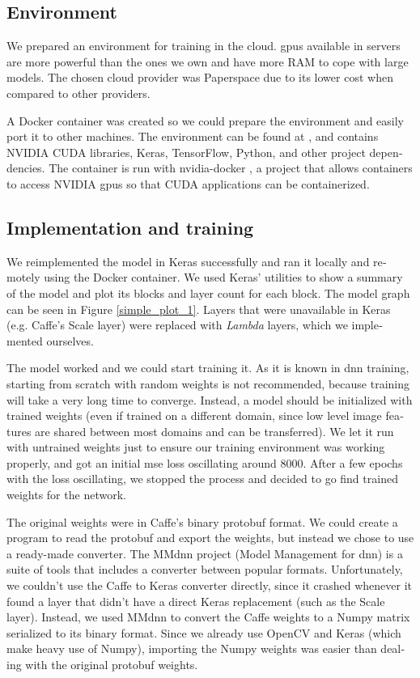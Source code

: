 \documentclass[12pt,openright,oneside,a4paper,english, brazilian]{abntex2}
\begin{document}
\begin{otherlanguage}{english}
\subsection{Environment}

We prepared an environment for training in the cloud. \acrshort{gpu}s available in servers are more powerful than the ones we own and have more RAM to cope with large models. The chosen cloud provider was Paperspace \cite{paperspace}
due to its lower cost when compared to other providers.

A Docker container was created so we could prepare the environment and easily port it to other machines. The environment can be found at \cite{colormotion_docker},
and contains NVIDIA CUDA libraries, Keras, TensorFlow, Python, and other project dependencies. The container is run with nvidia-docker \cite{nvidia_docker},
a project that allows containers to access NVIDIA \acrshort{gpu}s so that CUDA applications can be containerized.

\subsection{Implementation and training}

We reimplemented the model in Keras successfully and ran it locally and remotely using the Docker container. We used Keras' utilities to show a summary of the model and plot its blocks and layer count for each block. The model graph can be seen in Figure \ref{simple_plot_1}. Layers that were unavailable in Keras (e.g. Caffe's Scale layer) were replaced with \textit{Lambda} layers, which we implemented ourselves.

The model worked and we could start training it. As it is known in \acrshort{dnn} training, starting from scratch with random weights is not recommended, because training will take a very long time to converge. Instead, a model should be initialized with trained weights (even if trained on a different domain, since low level image features are shared between most domains and can be transferred). We let it run with untrained weights just to ensure our training environment was working properly, and got an initial \acrshort{mse} loss oscillating around 8000. After a few epochs with the loss oscillating, we stopped the process and decided to go find trained weights for the network.

The original weights were in Caffe's binary protobuf format. We could create a program to read the protobuf and export the weights, but instead we chose to use a ready-made converter. The MMdnn \cite{mmdnn} project (Model Management for \acrshort{dnn}) is a suite of tools that includes a converter between popular formats. Unfortunately, we couldn't use the Caffe to Keras converter directly, since it crashed whenever it found a layer that didn't have a direct Keras replacement (such as the Scale layer). Instead, we used MMdnn to convert the Caffe weights to a Numpy matrix serialized to its binary format. Since we already use OpenCV and Keras (which make heavy use of Numpy), importing the Numpy weights was easier than dealing with the original protobuf weights.


\end{otherlanguage}
\end{document}
